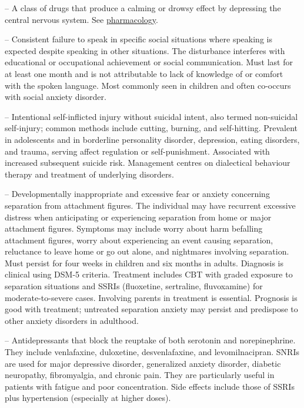 -- A class of drugs that produce a calming or drowsy effect by depressing the central nervous system. See \hyperlink{Pharmacology}{pharmacology}.

-- Consistent failure to speak in specific social situations where speaking is expected despite speaking in other situations. The disturbance interferes with educational or occupational achievement or social communication. Must last for at least one month and is not attributable to lack of knowledge of or comfort with the spoken language. Most commonly seen in children and often co-occurs with social anxiety disorder.

-- Intentional self-inflicted injury without suicidal intent, also termed non-suicidal self-injury; common methods include cutting, burning, and self-hitting. Prevalent in adolescents and in borderline personality disorder, depression, eating disorders, and trauma, serving affect regulation or self-punishment. Associated with increased subsequent suicide risk. Management centres on dialectical behaviour therapy and treatment of underlying disorders.

-- Developmentally inappropriate and excessive fear or anxiety concerning separation from attachment figures. The individual may have recurrent excessive distress when anticipating or experiencing separation from home or major attachment figures. Symptoms may include worry about harm befalling attachment figures, worry about experiencing an event causing separation, reluctance to leave home or go out alone, and nightmares involving separation. Must persist for four weeks in children and six months in adults. Diagnosis is clinical using DSM-5 criteria. Treatment includes CBT with graded exposure to separation situations and SSRIs (fluoxetine, sertraline, fluvoxamine) for moderate-to-severe cases. Involving parents in treatment is essential. Prognosis is good with treatment; untreated separation anxiety may persist and predispose to other anxiety disorders in adulthood.

-- Antidepressants that block the reuptake of both serotonin and norepinephrine. They include venlafaxine, duloxetine, desvenlafaxine, and levomilnacipran. SNRIs are used for major depressive disorder, generalized anxiety disorder, diabetic neuropathy, fibromyalgia, and chronic pain. They are particularly useful in patients with fatigue and poor concentration. Side effects include those of SSRIs plus hypertension (especially at higher doses).

